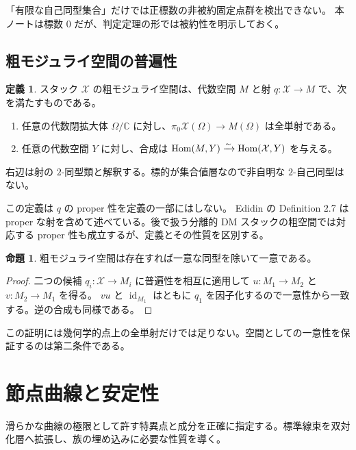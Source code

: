 \documentclass[dvipdfmx,a4paper,11pt]{article}
\theoremstyle{definition}
\newtheorem{prop}[thm]{命題}
\newtheorem{dfn}[thm]{定義}
\newenvironment{aim}{\begin{tcolorbox}[mybox,colback=green!3,title=この章で考えること,fonttitle=\bfseries]}{\end{tcolorbox}}
\newcommand{\C}{\mathbb C}\newcommand{\R}{\mathbb R}\newcommand{\Z}{\mathbb Z}\newcommand{\Q}{\mathbb Q}
\newcommand{\id}{\operatorname{id}}
\begin{document}
「有限な自己同型集合」だけでは正標数の非被約固定点群を検出できない。
本ノートは標数 $0$ だが、判定定理の形では被約性を明示しておく。

\subsection{粗モジュライ空間の普遍性}
\begin{dfn}\label{def:coarsestack}
スタック $\mathcal X$ の粗モジュライ空間は、代数空間 $M$ と射 $q:\mathcal X\to M$ で、次を満たすものである。
\begin{enumerate}
\item 任意の代数閉拡大体 $\Omega/\C$ に対し、$\pi_0\mathcal X(\Omega)\to M(\Omega)$ は全単射である。
\item 任意の代数空間 $Y$ に対し、合成は $\operatorname{Hom}(M,Y)\xrightarrow{\sim}\operatorname{Hom}(\mathcal X,Y)$ を与える。
\end{enumerate}
右辺は射の $2$-同型類と解釈する。標的が集合値層なので非自明な $2$-自己同型はない。
\end{dfn}
この定義は $q$ の proper 性を定義の一部にはしない。
Edidin の Definition 2.7 は proper な射を含めて述べている。後で扱う分離的 DM スタックの粗空間では対応する proper 性も成立するが、定義とその性質を区別する。

\begin{prop}
粗モジュライ空間は存在すれば一意な同型を除いて一意である。
\end{prop}
\begin{proof}
二つの候補 $q_i:\mathcal X\to M_i$ に普遍性を相互に適用して $u:M_1\to M_2$ と $v:M_2\to M_1$ を得る。
$vu$ と $\id_{M_1}$ はともに $q_1$ を因子化するので一意性から一致する。逆の合成も同様である。
\end{proof}
この証明には幾何学的点上の全単射だけでは足りない。空間としての一意性を保証するのは第二条件である。

\par\bigskip\Needspace{.70\textheight}
\section{節点曲線と安定性}\label{sec:stable}
\begin{aim}
滑らかな曲線の極限として許す特異点と成分を正確に指定する。標準線束を双対化層へ拡張し、族の埋め込みに必要な性質を導く。
\end{aim}
\end{document}
